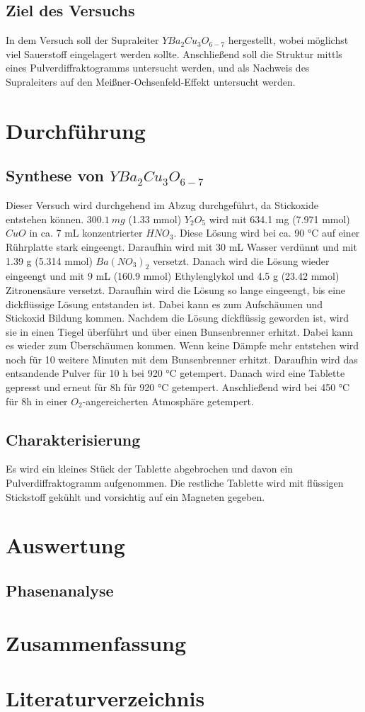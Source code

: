 \documentclass[12pt, a4paper]{article}
\begin{document}
\subsection{Ziel des Versuchs}
{In dem Versuch soll der Supraleiter $YBa_2Cu_3O_{6-7}$ hergestellt, wobei möglichst viel Sauerstoff eingelagert werden sollte. Anschließend soll die Struktur mittls eines Pulverdiffraktogramms untersucht werden, 
und als Nachweis des Supraleiters auf den Meißner-Ochsenfeld-Effekt untersucht werden.\cite{Skript}
}

\newpage
\section{Durchführung}
\subsection{\texorpdfstring{Synthese von $YBa_2Cu_3O_{6-7}$}{Synthese von YBa2Cu3O6-7}}
{

Dieser Versuch wird durchgehend im Abzug durchgeführt, da Stickoxide entstehen können.
$300.1\ mg$ (1.33 mmol) $Y_2O_5$ wird mit 634.1 mg (7.971 mmol) $CuO$ in ca. 7 mL konzentrierter $HNO_3$. Diese Lösung wird bei ca. 90 °C auf einer 
Rührplatte stark eingeengt. Daraufhin wird mit 30 mL Wasser verdünnt und mit 1.39 g (5.314 mmol) $Ba(NO_3)_2$ versetzt. Danach wird die Lösung wieder eingeengt und mit 
9 mL (160.9 mmol) Ethylenglykol und 4.5 g (23.42 mmol) Zitronensäure versetzt. Daraufhin wird die Lösung so lange eingeengt, bis eine dickflüssige Lösung entstanden ist. 
Dabei kann es zum Aufschäumen und Stickoxid Bildung kommen. Nachdem die Lösung dickflüssig geworden ist, wird sie in einen Tiegel überführt und über einen Bunsenbrenner erhitzt. 
Dabei kann es wieder zum Überschäumen kommen. Wenn keine Dämpfe mehr entstehen wird noch für 10 weitere Minuten mit dem Bunsenbrenner erhitzt. Daraufhin wird das entsandende Pulver für 10 h bei 920 °C getempert. 
Danach wird eine Tablette gepresst und erneut für 8h für 920 °C getempert. Anschließend wird bei 450 °C für 8h in einer $O_2$-angereicherten Atmosphäre getempert.\cite{Skript}
}
\subsection{Charakterisierung}
{
Es wird ein kleines Stück der Tablette abgebrochen und davon ein Pulverdiffraktogramm aufgenommen. Die restliche Tablette wird mit flüssigen Stickstoff gekühlt und vorsichtig auf 
ein Magneten gegeben. 
}



\newpage
\section{Auswertung}
\subsection{Phasenanalyse}






\newpage
\section{Zusammenfassung}
\cite{Skript}



\newpage
\section{Literaturverzeichnis}
\printbibliography
\end{document}
